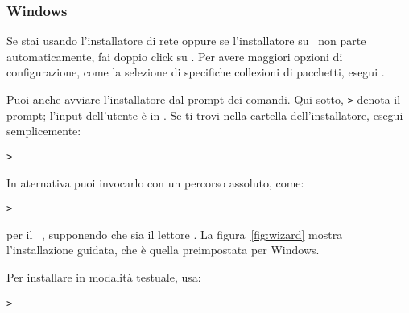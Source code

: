 \documentclass{article}
\begin{document}
\subsubsection{Windows}

Se stai usando l'installatore di rete oppure se l'installatore su \DVD\
non parte automaticamente, fai doppio click su .
Per avere maggiori opzioni di configurazione, come la selezione di
specifiche collezioni di pacchetti, esegui
.

Puoi anche avviare l'installatore dal prompt dei comandi. Qui sotto,
\texttt{>} denota il prompt; l'input dell'utente è in
. Se ti trovi nella cartella dell'installatore,
esegui semplicemente:
\begin{alltt}
> 
\end{alltt}

In aternativa puoi invocarlo con un percorso assoluto, come:
\begin{alltt}
> 
\end{alltt}
per il \DVD\ \TK, supponendo che  sia il lettore \DVD. La
figura~\ref{fig:wizard} mostra l'installazione guidata, che è quella
preimpostata per Windows.

Per installare in modalità testuale, usa:
\begin{alltt}
> 
\end{alltt}
\end{document}
